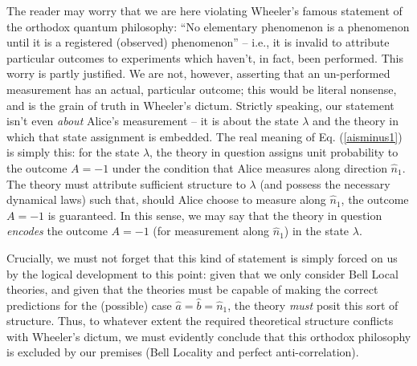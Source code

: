 \documentclass[aps,prc,onecolumn,12pt]{revtex4-2}
\begin{document}
The reader may worry that we are here violating
Wheeler's famous statement of the orthodox
quantum philosophy:  ``No elementary phenomenon is a phenomenon
until it is a registered (observed) phenomenon'' \cite{wheelerquote}
-- i.e., it
is invalid to attribute particular outcomes to experiments which
haven't, in fact, been performed.  This worry is partly justified.
We are not, however,
asserting that an un-performed measurement has an actual, particular
outcome; this would be literal nonsense, and is the grain of truth in
Wheeler's dictum.  Strictly speaking, our statement isn't even
\emph{about} Alice's measurement -- it is about the state $\lambda$
and the theory in which that state assignment is embedded.  The
real meaning of Eq. (\ref{aisminus1}) is simply this:
for the state $\lambda$, the theory in question
assigns unit probability to the outcome $A = -1$ under the condition
that Alice measures along direction $\hat{n}_1$.  The theory must
attribute sufficient structure to $\lambda$ (and possess the necessary
dynamical laws) such that, should Alice choose to measure along
$\hat{n}_1$, the outcome $A = -1$ is guaranteed.  In this sense, we
may say that the theory in question \emph{encodes} the outcome $A =
-1$ (for measurement along $\hat{n}_1$) in the state $\lambda$.

Crucially, we must not forget that this kind of
statement is simply forced on us by the logical development to this
point:  given that we only consider Bell Local theories, and given
that the theories must be capable of making the correct predictions
for the (possible) case $\hat{a} = \hat{b} = \hat{n}_1$, the theory
\emph{must} posit this sort of structure.  Thus, to whatever extent
the required theoretical structure conflicts with Wheeler's dictum,
we must evidently conclude that this orthodox philosophy is excluded
by our premises (Bell Locality and perfect anti-correlation).
\end{document}
